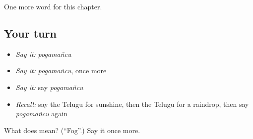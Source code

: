 \begin{grammarlens}[title={What you've built}]
One more word for this chapter.
\end{grammarlens}

\subsection*{Your turn}
\begin{itemize}
\raggedright
  \item \emph{Say it:} \emph{pogamañcu}
  \item \emph{Say it:} \emph{pogamañcu}, once more
  \item \emph{Say it:} say \emph{pogamañcu}
  \item \emph{Recall:} say the Telugu for sunshine, then the Telugu for a raindrop, then say \emph{pogamañcu} again
\end{itemize}

\begin{tcolorbox}[breakable,colback=teal!4,colframe=teal!35!black,title={Before you move on}]
What does  mean? (\textquotedblleft{}Fog\textquotedblright{}.) Say it once more.
\end{tcolorbox}
